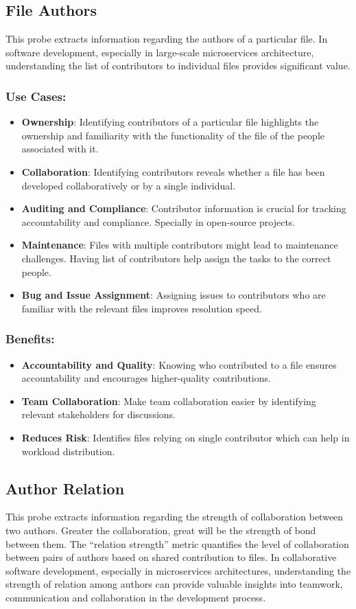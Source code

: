 \subsection{File Authors}
This probe extracts information regarding the authors of a particular file. In software development, especially in large-scale microservices architecture, understanding the list of contributors to individual files provides significant value.
\subsubsection{Use Cases:}
\begin{itemize}[label=$\bullet$]
	\item \textbf{Ownership}: Identifying contributors of a particular file highlights the ownership and familiarity with the functionality of the file of the people associated with it.
	\item \textbf{Collaboration}: Identifying contributors reveals whether a file has been developed collaboratively or by a single individual.
	\item \textbf{Auditing and Compliance}: Contributor information is crucial for tracking accountability and compliance. Specially in open-source projects.
	\item \textbf{Maintenance}: Files with multiple contributors might lead to maintenance challenges. Having list of contributors help assign the tasks to the correct people.
	\item \textbf{Bug and Issue Assignment}: Assigning issues to contributors who are familiar with the relevant files improves resolution speed.
\end{itemize}
\subsubsection{Benefits:}
\begin{itemize}[label=$\bullet$]
	\item \textbf{Accountability and Quality}: Knowing who contributed to a file ensures accountability and encourages higher-quality contributions.
	\item \textbf{Team Collaboration}: Make team collaboration easier by identifying relevant stakeholders for discussions.
	\item \textbf{Reduces Risk}: Identifies files relying on single contributor which can help in workload distribution.
\end{itemize} 

\subsection{Author Relation}
This probe extracts information regarding the strength of collaboration between two authors. Greater the collaboration, great will be the strength of bond between them. The ``relation strength'' metric quantifies the level of collaboration between pairs of authors based on shared contribution to files. In collaborative software development, especially in microservices architectures, understanding the strength of relation among authors can provide valuable insights into teamwork, communication and collaboration in the development process.
